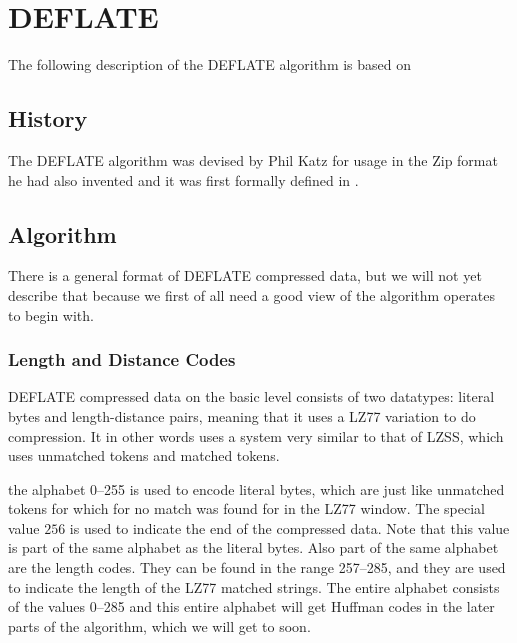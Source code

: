 \begin{comment}
  
\end{comment}

\chapter{DEFLATE}
\label{cha:deflate}

The following description of the DEFLATE algorithm is based on \cite{pkware:_appnot,deutsch96:_deflat_compr_data_format_specif,Salomon:2004:DCC,feldspar:_explan_deflat_algor}

\section{History}

The DEFLATE algorithm was devised by Phil Katz for usage in the Zip
format he had also invented and it was first formally defined in
\cite{deutsch96:_deflat_compr_data_format_specif}.

\section{Algorithm}

There is a general format of DEFLATE compressed data, but we will not
yet describe that because we first of all need a good view of the
algorithm operates to begin with.

\subsection{Length and Distance Codes}

DEFLATE compressed data on the basic level consists of two datatypes:
literal bytes and length-distance pairs, meaning that it uses a LZ77
variation to do compression. It in other words uses a system very
similar to that of LZSS, which uses unmatched tokens and matched
tokens.

the alphabet 0--255 is used to encode literal bytes, which are just
like unmatched tokens for which for no match was found for in the LZ77
window. The special value $256$ is used to indicate the end of the
compressed data. Note that this value is part of the same alphabet as
the literal bytes. Also part of the same alphabet are the length
codes. They can be found in the range 257--285, and they are used to
indicate the length of the LZ77 matched strings. The entire alphabet
consists of the values 0--285 and this entire alphabet will get
Huffman codes in the later parts of the algorithm, which we will get
to soon.


